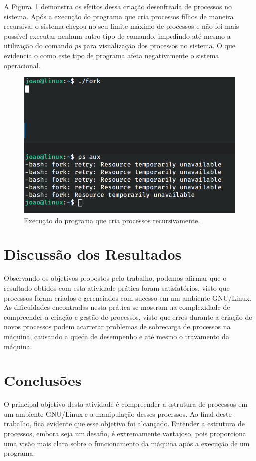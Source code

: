 \documentclass[
	12pt,				%
	oneside,   	        %
	a4paper,			%
	english,			%
	french,				%
	spanish,			%
	brazil,				%
	]{pacotes/abntex2}
\begin{document}
A Figura~\ref{fig:bomb} demonstra os efeitos dessa criação desenfreada de processos no sistema. Após a execução do programa que cria processos filhos de maneira recursiva, o sistema chegou no seu limite máximo de processos e não foi mais possível executar nenhum outro tipo de comando, impedindo até mesmo a utilização do comando \textit{ps} para visualização dos processos no sistema. O que evidencia o como este tipo de programa afeta negativamente o sistema operacional.

\begin{figure}[H]
  \centering
  \includegraphics[scale=0.5]{figuras/bomb.png}
  \caption{Execução do programa que cria processos recursivamente.}
  \label{fig:bomb}
\end{figure}

\section{Discussão dos Resultados}
\label{sec:discussao}
Observando os objetivos propostos pelo trabalho, podemos afirmar que o resultado obtidos com esta atividade prática foram satisfatórios, visto que processos foram criados e gerenciados com sucesso em um ambiente GNU/Linux. As dificuldades encontradas nesta prática se mostram na complexidade de compreender a criação e gestão de processos, visto que erros durante a criação de novos processos podem acarretar problemas de sobrecarga de processos na máquina, causando a queda de desempenho e até mesmo o travamento da máquina.

\section{Conclusões}
\label{sec:conclusoes}
O principal objetivo desta atividade é compreender a estrutura de processos em um ambiente GNU/Linux e a manipulação desses processos. Ao final deste trabalho, fica evidente que esse objetivo foi alcançado. Entender a estrutura de processos, embora seja um desafio, é extremamente vantajoso, pois proporciona uma visão mais clara sobre o funcionamento da máquina após a execução de um programa.
\end{document}
